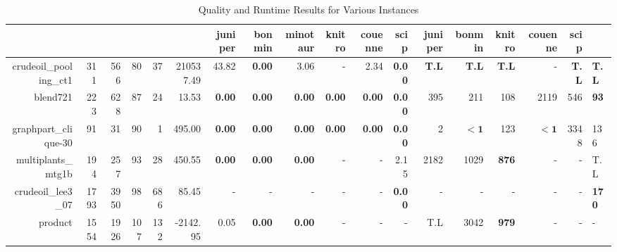 \begin{table*}[t] 
\footnotesize 
\caption{Quality and Runtime Results for Various Instances} 
\begin{tabular}{|r|r|r|r|r||r||r|r|r|r|r||r|r|r|r|r|r|} 
\hline 
  & juniper    & bonmin  & minotaur & knitro & couenne        & scip            & juniper          & bonmin  & knitro  & couenne         & scip \\  
    \hline 
    \hline 
            crudeoil\_pooling\_ct1 &          311 &           566 &           80 &            37 &           210537.49 &          43.82 &  \textbf{0.00} &          3.06 &              - &          2.34 & \textbf{0.00} &       \textbf{T.L} &       \textbf{T.L} &       \textbf{T.L} &                  - & \textbf{T.L} & \textbf{T.L} \\ 
                          blend721 &          223 &           628 &           87 &            24 &               13.53 &  \textbf{0.00} &  \textbf{0.00} & \textbf{0.00} &  \textbf{0.00} & \textbf{0.00} & \textbf{0.00} &                395 &                211 &                108 &               2119 &          546 &  \textbf{93} \\ 
              graphpart\_clique-30 &           91 &            31 &           90 &             1 &              495.00 &  \textbf{0.00} &  \textbf{0.00} & \textbf{0.00} &  \textbf{0.00} & \textbf{0.00} & \textbf{0.00} &                  2 &         $\bm{< 1}$ &                123 &         $\bm{< 1}$ &         3348 &          136 \\ 
                multiplants\_mtg1b &          194 &           257 &           93 &            28 &              450.55 &  \textbf{0.00} &  \textbf{0.00} & \textbf{0.00} &              - &             - &          2.15 &               2182 &               1029 &       \textbf{876} &                  - &            - &          T.L \\ 
                crudeoil\_lee3\_07 &         1793 &          3950 &           98 &           686 &               85.45 &              - &              - &             - &              - &             - & \textbf{0.00} &                  - &                  - &                  - &                  - &            - & \textbf{170} \\ 
                           product &         1554 &          1926 &          107 &           132 &            -2142.95 &           0.05 &  \textbf{0.00} & \textbf{0.00} &              - &             - &             - &                T.L &               3042 &       \textbf{979} &                  - &            - &            - \\ 

\end{tabular}
\end{table*}

